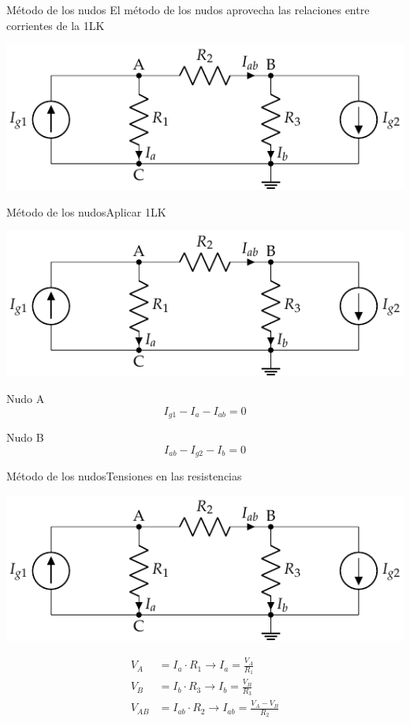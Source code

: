 \documentclass[aspectratio=169, xcolor={usenames,svgnames,dvipsnames}]{beamer}
\begin{document}
\begin{frame}{Método de los nudos}
El método de los nudos aprovecha las relaciones entre corrientes de la 1LK
\begin{center}
\includegraphics[width=.7\linewidth]{../figs/nudos.pdf}
\end{center}
\end{frame}

\begin{frame}{Método de los nudos}{Aplicar 1LK}
\begin{center}
\includegraphics[width=.7\linewidth]{../figs/nudos.pdf}
\end{center}

Nudo A
\begin{equation*}
  I_{g1} - I_a - I_{ab} = 0
\end{equation*}

Nudo B
\begin{equation*}
  I_{ab} - I_{g2} - I_b = 0
\end{equation*}
\end{frame}

\begin{frame}{Método de los nudos}{Tensiones en las resistencias}
\begin{center}
\includegraphics[width=.7\linewidth]{../figs/nudos.pdf}
\end{center}
\begin{align*}
  V_A &= I_a \cdot R_1\rightarrow I_a = \frac{V_A}{R_1}\\
  V_B &= I_b \cdot R_3\rightarrow I_b = \frac{V_B}{R_3}\\
  V_{AB} &= I_{ab} \cdot R_2 \rightarrow I_{ab} = \frac{V_A-V_B}{R_2}
\end{align*}
\end{frame}
\end{document}
